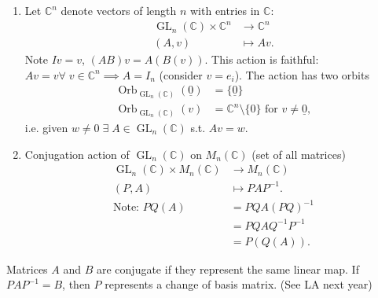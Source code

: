 \begin{enumerate}
    \item Let $\mathbb{C}^n$ denote vectors of length $n$ with entries in $\mathbb{C}$:
    \begin{align*}
        \operatorname{GL}_n(\mathbb{C}) \times \mathbb{C}^n &\to \mathbb{C}^n \\
        (A, v) &\mapsto Av.
    \end{align*} 
    Note $Iv = v$, $(AB)v = A(B(v))$.
    This action is faithful: $Av = v \forall \; v \in \mathbb{C}^n \implies A = I_n$ (consider $v = e_i$).
    The action has two orbits
    \begin{align*}
        \operatorname{Orb}_{\operatorname{GL}_n(\mathbb{C})}(\underline{0}) &= \{\underline{0}\} \\
        \operatorname{Orb}_{\operatorname{GL}_n(\mathbb{C})}(v) &= \mathbb{C}^n \setminus \{0\} \text{ for } v \neq \underline{0},
    \end{align*} i.e. given $w \neq 0 \; \exists \; A \in \operatorname{GL}_n(\mathbb{C})$ s.t. $Av = w$.
    \item Conjugation action of $\operatorname{GL}_n(\mathbb{C})$ on $M_n(\mathbb{C})$ (set of all matrices)
    \begin{align*}
        \operatorname{GL}_n(\mathbb{C}) \times M_n(\mathbb{C}) &\to M_n(\mathbb{C}) \\
        (P, A) &\mapsto P A P^{-1}. \\
    \text{Note: } PQ(A) &= PQ A (PQ)^{-1} \\
        &= PQ A Q^{-1} P^{-1} \\
        &= P(Q(A)).
    \end{align*} 
\end{enumerate} 

\begin{remark}
    Matrices $A$ and $B$ are conjugate if they represent the same linear map. 
    If $PAP^{-1} = B$, then $P$ represents a change of basis matrix. (See LA next year)
\end{remark} 

